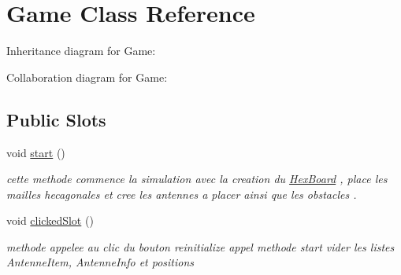 \hypertarget{class_game}{}\section{Game Class Reference}
\label{class_game}


Inheritance diagram for Game\+:


Collaboration diagram for Game\+:
\subsection*{Public Slots}
\begin{DoxyCompactItemize}
\item 
void \mbox{\hyperlink{class_game_a3d9b98f7c4a96ecf578f75b96c9f0e90}{start}} ()
\begin{DoxyCompactList}\small\item\em cette methode commence la simulation avec la creation du \mbox{\hyperlink{class_hex_board}{Hex\+Board}} , place les mailles hecagonales et cree les antennes a placer ainsi que les obstacles . \end{DoxyCompactList}\item 
void \mbox{\hyperlink{class_game_a1beabf37abc60c2e8b1fc123d75a0fd9}{clicked\+Slot}} ()
\begin{DoxyCompactList}\small\item\em methode appelee au clic du bouton reinitialize appel methode start vider les listes Antenne\+Item, Antenne\+Info et positions \end{DoxyCompactList}\end{DoxyCompactItemize}
